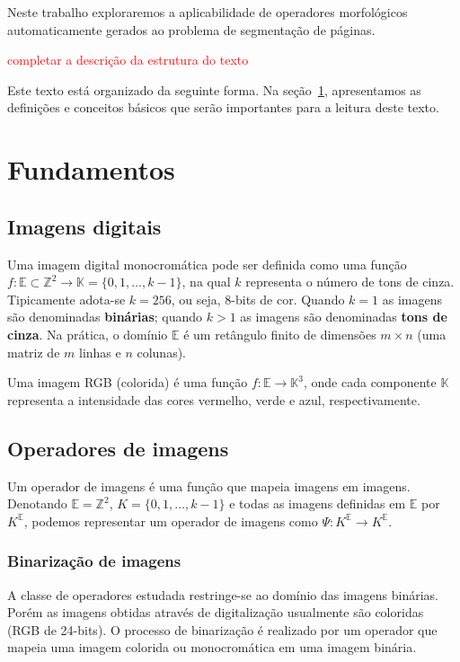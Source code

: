 \documentclass[a4paper,11pt]{article}
\newcommand{\TODO}[1]{\textcolor{red}{#1}}
\begin{document}
Neste trabalho exploraremos a aplicabilidade de operadores
morfológicos automaticamente gerados ao problema de segmentação de
páginas.

\TODO{completar a descrição da estrutura do texto}

Este texto está organizado da seguinte forma. Na seção~\ref{sec:fundamentos},
apresentamos as definições e conceitos básicos que serão importantes
para a leitura deste texto.

\section{Fundamentos}
\label{sec:fundamentos}

\subsection{Imagens digitais}
  Uma imagem digital monocromática pode ser definida como uma função $f:
  \mathbb{E} \subset \mathbb{Z}^2 \to \mathbb{K} = \{0,1,\ldots,k-1\}$, na qual $k$ representa o número de tons de cinza. Tipicamente adota-se $k=256$, ou seja, 8-bits de cor. Quando $k=1$ as imagens são denominadas {\bf binárias}; quando $k>1$ as imagens são denominadas {\bf tons de cinza}. Na prática, o domínio $\mathbb{E}$ é um retângulo finito de dimensões $m\times n$ (uma matriz de $m$ linhas e $n$ colunas).

  Uma imagem RGB (colorida) é uma função $f: \mathbb{E} \to \mathbb{K}^3$, onde cada componente $\mathbb{K}$ representa a intensidade das cores vermelho, verde e azul, respectivamente.

\subsection{Operadores de imagens}
Um operador de imagens é uma função que mapeia imagens em
imagens. Denotando $\mathbb{E}=\mathbb{Z}^2$, $K=\{0,1,\ldots,k-1\}$ e
todas as imagens definidas em $\mathbb{E}$ por $K^{\mathbb{E}}$,
  podemos representar um operador de imagens como $\Psi: K^{\mathbb{E}}
    \to K^{\mathbb{E}}$.

\subsubsection{Binarização de imagens}

A classe de operadores estudada restringe-se ao domínio das imagens binárias. Porém as imagens obtidas através de digitalização usualmente são coloridas (RGB de 24-bits). O processo de binarização é realizado por um operador que mapeia uma imagem colorida ou monocromática em uma imagem binária.
\end{document}
